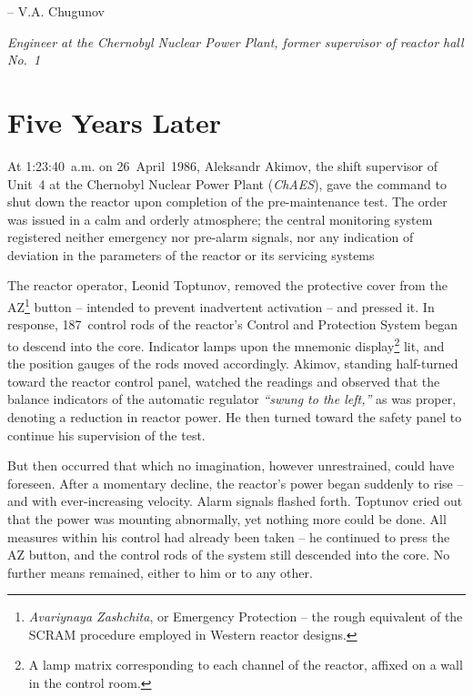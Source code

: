 \documentclass[openright]{bookest}
\begin{document}
\begin{flushright}\small{
-- V.A. Chugunov

\textit{Engineer at the Chernobyl Nuclear Power Plant, former supervisor of reactor hall No.~1}
}\end{flushright}

\mainmatter

\chapter{Five Years Later}

At 1:23:40~a.m. on 26~April~1986, Aleksandr Akimov, the shift supervisor of Unit~4 at the Chernobyl Nuclear Power Plant (\textit{ChAES}), gave the command to shut down the reactor upon completion of the pre-maintenance test. The order was issued in a calm and orderly atmosphere; the central monitoring system registered neither emergency nor pre-alarm signals, nor any indication of deviation in the parameters of the reactor or its servicing systems

The reactor operator, Leonid Toptunov, removed the protective cover from the AZ\footnote{\textit{Avariynaya Zashchita}, or Emergency Protection -- the rough equivalent of the SCRAM procedure employed in Western reactor designs.} button -- intended to prevent inadvertent activation -- and pressed it. In response, \num{187}~control rods of the reactor's Control and Protection System began to descend into the core. Indicator lamps upon the mnemonic display\footnote{A lamp matrix corresponding to each channel of the reactor, affixed on a wall in the control room.} lit, and the position gauges of the rods moved accordingly. Akimov, standing half-turned toward the reactor control panel, watched the readings and observed that the balance indicators of the automatic regulator \textit{``swung to the left,''} as was proper, denoting a reduction in reactor power. He then turned toward the safety panel to continue his supervision of the test.


But then occurred that which no imagination, however unrestrained, could have foreseen. After a momentary decline, the reactor's power began suddenly to rise -- and with ever-increasing velocity. Alarm signals flashed forth. Toptunov cried out that the power was mounting abnormally, yet nothing more could be done. All measures within his control had already been taken -- he continued to press the AZ button, and the control rods of the system still descended into the core. No further means remained, either to him or to any other.
\end{document}

